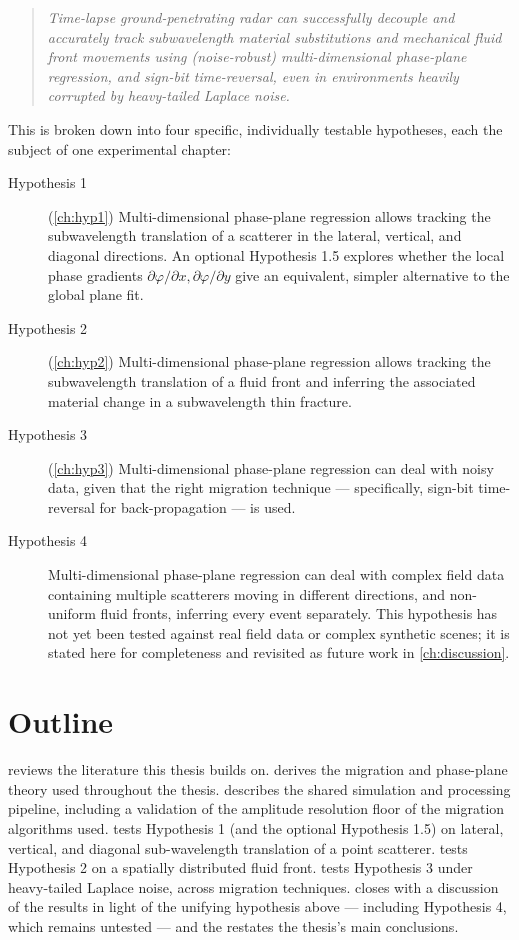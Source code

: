 \begin{quote}
\emph{Time-lapse ground-penetrating radar can successfully decouple and
accurately track subwavelength material substitutions and mechanical fluid
front movements using (noise-robust) multi-dimensional phase-plane
regression, and sign-bit time-reversal, even in environments heavily
corrupted by heavy-tailed Laplace noise.}
\end{quote}

This is broken down into four specific, individually testable hypotheses,
each the subject of one experimental chapter:

\begin{description}
  \item[Hypothesis 1] (\cref{ch:hyp1}) Multi-dimensional phase-plane
    regression allows tracking the subwavelength translation of a scatterer
    in the lateral, vertical, and diagonal directions. An optional
    Hypothesis 1.5 explores whether the local phase gradients
    $\partial\varphi/\partial x,\partial\varphi/\partial y$ give an
    equivalent, simpler alternative to the global plane fit.
  \item[Hypothesis 2] (\cref{ch:hyp2}) Multi-dimensional phase-plane
    regression allows tracking the subwavelength translation of a fluid
    front and inferring the associated material change in a subwavelength
    thin fracture.
  \item[Hypothesis 3] (\cref{ch:hyp3}) Multi-dimensional phase-plane
    regression can deal with noisy data, given that the right migration
    technique --- specifically, sign-bit time-reversal for back-propagation
    --- is used.
  \item[Hypothesis 4] Multi-dimensional phase-plane regression can deal with
    complex field data containing multiple scatterers moving in different
    directions, and non-uniform fluid fronts, inferring every event
    separately. This hypothesis has not yet been tested against real field
    data or complex synthetic scenes; it is stated here for completeness and
    revisited as future work in \cref{ch:discussion}.
\end{description}

\section*{Outline}

 reviews the literature this thesis builds on.
 derives the migration and phase-plane theory used
throughout the thesis.  describes the shared simulation
and processing pipeline, including a validation of the amplitude resolution
floor of the migration algorithms used.  tests Hypothesis 1
(and the optional Hypothesis 1.5) on lateral, vertical, and diagonal
sub-wavelength translation of a point scatterer.  tests
Hypothesis 2 on a spatially distributed fluid front.  tests
Hypothesis 3 under heavy-tailed Laplace noise, across migration techniques.
 closes with a discussion of the results in light of the
unifying hypothesis above --- including Hypothesis 4, which remains
untested --- and the  restates the thesis's main
conclusions.
